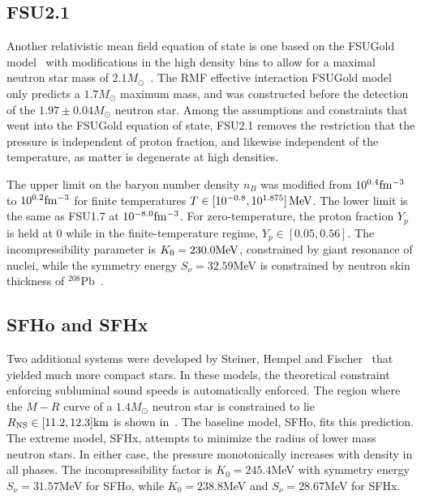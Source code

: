 \subsection{FSU2.1}
\label{sec:fsu21}

Another relativistic mean field equation of state is one based on the FSUGold model~\cite{todd2005neutron} with modifications in the high density bins to allow for a maximal neutron star mass of $2.1 M_\odot$~\cite{shen2011second}.  The RMF effective interaction FSUGold model only predicts a $1.7 M_\odot$ maximum mass, and was constructed before the detection of the $1.97 \pm 0.04 M_\odot$ neutron star.
Among the assumptions and constraints that went into the FSUGold equation of state, FSU2.1 removes the restriction that the pressure is independent of proton fraction, and likewise independent of the temperature, as matter is degenerate at high densities.

The upper limit on the baryon number density $n_B$ was modified from $10^{0.4} {\rm fm^{-3}}$ to $10^{0.2} {\rm fm^{-3}}$ for finite temperatures $T \in [10^{-0.8} , 10^{1.875}]\, {\rm MeV}$.  The lower limit is the same as FSU1.7 at $10^{-8.0} {\rm fm^{-3}}$.  For zero-temperature, the proton fraction $Y_p$ is held at $0$ while in the finite-temperature regime, $Y_p \in [0.05 , 0.56]$.  The incompressibility parameter is $K_0 = 230.0 {\rm MeV}$, constrained by giant resonance of nuclei, while the symmetry energy $S_\nu = 32.59$MeV is constrained by neutron skin thickness of $^208$Pb~\cite{fattoyev2010relativistic}.

\subsection{SFHo and SFHx}
\label{sec:sfh}

Two additional systems were developed by Steiner, Hempel and Fischer~\cite{steiner2013core} that yielded much more compact stars.
In these models, the theoretical constraint enforcing subluminal sound speeds is automatically enforced.  The region where the $M-R$ curve of a $1.4 M_\odot$ neutron star is constrained to lie $R_{\rm NS} \in [11.2,12.3] {\rm km}$ is shown in~\cite{steiner6871apjl}.
The baseline model, SFHo, fits this prediction.  The extreme model, SFHx, attempts to minimize the radius of lower mass neutron stars.  In either case, the pressure monotonically increases with density in all phases.
The incompressibility factor is $K_0 = 245.4$MeV with symmetry energy $S_\nu = 31.57$MeV for SFHo, while $K_0 = 238.8$MeV and $S_\nu = 28.67$MeV for SFHx.

